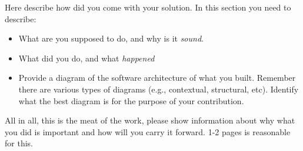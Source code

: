 Here describe how did you come with your solution.
In this section you need to describe:

\begin{itemize}
    \item What are you supposed to do, and why is it \emph{sound}.
    \item What did you do, and what \emph{happened}
    \item Provide a diagram of the software architecture of what you built. Remember there are various types of diagrams (e.g., contextual, structural, etc). Identify what the best diagram is for the purpose of your contribution.
\end{itemize}

All in all, this is the meat of the work, please show information about why what you did is important and how will you carry it forward.
1-2 pages is reasonable for this.
